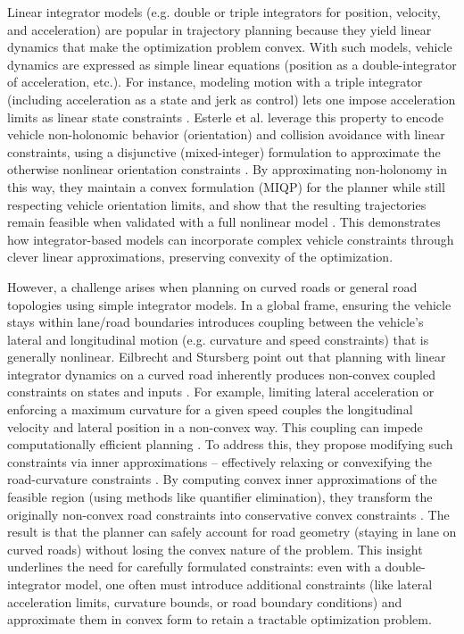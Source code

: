 Linear integrator models (e.g. double or triple integrators for position, velocity, and acceleration) are popular in trajectory planning because they
yield linear dynamics that make the optimization problem convex.
With such models, vehicle dynamics are expressed as simple linear equations (position as a double-integrator of acceleration, etc.).
For instance, modeling motion with a triple integrator (including acceleration as a state and jerk as control) lets one impose acceleration limits as
linear state constraints \cite{esterle_optimal_2020}.
Esterle et al.
leverage this property to encode vehicle non-holonomic behavior (orientation) and collision avoidance with linear constraints,
using a disjunctive (mixed-integer) formulation to approximate the otherwise nonlinear orientation constraints \cite{esterle_optimal_2020}.
By approximating non-holonomy in this way, they maintain a convex formulation (MIQP) for the planner while still respecting vehicle orientation
limits, and show that the resulting trajectories remain feasible when validated with a full nonlinear model \cite{esterle_optimal_2020}.
This demonstrates how integrator-based models can incorporate complex vehicle constraints through clever linear approximations, preserving convexity
of the optimization.

However, a challenge arises when planning on curved roads or general road topologies using simple integrator models.
In a global frame, ensuring the vehicle stays within lane/road boundaries introduces coupling between the vehicle's lateral and longitudinal motion
(e.g. curvature and speed constraints) that is generally nonlinear.
Eilbrecht and Stursberg point out that planning with linear integrator dynamics on a curved road inherently produces non-convex coupled constraints
on states and inputs \cite{eilbrecht_challenges_2020}.
For example, limiting lateral acceleration or enforcing a maximum curvature for a given speed couples the longitudinal velocity and lateral position
in a non-convex way.
This coupling can impede computationally efficient planning \cite{eilbrecht_challenges_2020}.
To address this, they propose modifying such constraints via inner approximations – effectively relaxing or convexifying the road-curvature
constraints \cite{eilbrecht_challenges_2020}.
By computing convex inner approximations of the feasible region (using methods like quantifier elimination), they transform the originally non-convex
road constraints into conservative convex constraints \cite{eilbrecht_challenges_2020}.
The result is that the planner can safely account for road geometry (staying in lane on curved roads) without losing the convex nature of the
problem.
This insight underlines the need for carefully formulated constraints: even with a double-integrator model, one often must introduce additional
constraints (like lateral acceleration limits, curvature bounds, or road boundary conditions) and approximate them in convex form to retain a
tractable optimization problem.

